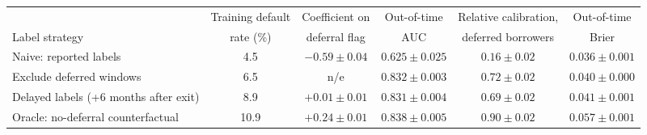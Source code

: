 \begin{tabular}{lccccc}
\toprule
 & Training default & Coefficient on & Out-of-time & Relative calibration, & Out-of-time \\
Label strategy & rate (\%) & deferral flag & AUC & deferred borrowers & Brier \\
\midrule
Naive: reported labels & 4.5 & $-0.59 \pm 0.04$ & $0.625 \pm 0.025$ & $0.16 \pm 0.02$ & $0.036 \pm 0.001$ \\
Exclude deferred windows & 6.5 & n/e & $0.832 \pm 0.003$ & $0.72 \pm 0.02$ & $0.040 \pm 0.000$ \\
Delayed labels (+6 months after exit) & 8.9 & $+0.01 \pm 0.01$ & $0.831 \pm 0.004$ & $0.69 \pm 0.02$ & $0.041 \pm 0.001$ \\
\midrule
Oracle: no-deferral counterfactual & 10.9 & $+0.24 \pm 0.01$ & $0.838 \pm 0.005$ & $0.90 \pm 0.02$ & $0.057 \pm 0.001$ \\
\bottomrule
\end{tabular}
